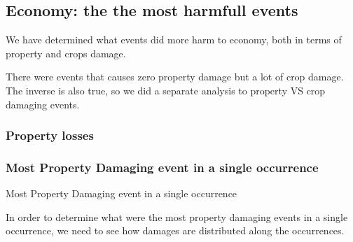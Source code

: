 \documentclass[]{article}
\begin{document}
\subsection{Economy: the the most harmfull
events}\label{economy-the-the-most-harmfull-events}

We have determined what events did more harm to economy, both in terms
of property and crops damage.

There were events that causes zero property damage but a lot of crop
damage. The inverse is also true, so we did a separate analysis to
property VS crop damaging events.

\subsubsection{Property losses}\label{property-losses}

\subsubsection{Most Property Damaging event in a single
occurrence}\label{most-property-damaging-event-in-a-single-occurrence}

Most Property Damaging event in a single occurrence

In order to determine what were the most property damaging events in a
single occurrence, we need to see how damages are distributed along the
occurrences.
\end{document}
